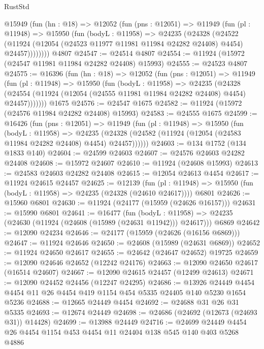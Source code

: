 \begin{lexlean}{RustStd}
\begin{coremodule}
    @15949
      (fun (hn : @18) =>
      @12052
        (fun (pns : @12051) =>
        @11949
          (fun (pl : @11948) =>
          @15950
            (fun (bodyL : @11958) =>
            @24235
              (@24328
                (@24522
                  (@11924 (@12054 (@24523 @11977 @11981 @11984 @24282 @24408) @4454) @24457))))))))
    @4807
@24547 := @24514 @4807
@24554 := @11924 (@15972 (@24547 @11981 @11984 @24282 @24408) @15993)
@24555 := @24523 @4807
@24575 := @16396
    (fun (hn : @18) =>
    @12052
      (fun (pns : @12051) =>
      @11949
        (fun (pl : @11948) =>
        @15950
          (fun (bodyL : @11958) =>
          @24235
            (@24328
              (@24554 (@11924 (@12054 (@24555 @11981 @11984 @24282 @24408) @4454) @24457)))))))
    @1675
@24576 := @24547 @1675
@24582 := @11924 (@15972 (@24576 @11984 @24282 @24408) @15993)
@24583 := @24555 @1675
@24599 := @16426
    (fun (pns : @12051) =>
    @11949
      (fun (pl : @11948) =>
      @15950
        (fun (bodyL : @11958) =>
        @24235 (@24328 (@24582 (@11924 (@12054 (@24583 @11984 @24282 @24408) @4454) @24457))))))
@24603 := @134 @1752 (@134 @1833 @140)
@24604 := @24599 @24603
@24607 := @24576 @24603 @24282 @24408
@24608 := @15972 @24607
@24610 := @11924 (@24608 @15993)
@24613 := @24583 @24603 @24282 @24408
@24615 := @12054 @24613 @4454
@24617 := @11924 @24615 @24457
@24625 := @12139
    (fun (pl : @11948) => @15950 (fun (bodyL : @11958) => @24235 (@24328 (@24610 @24617))))
    @6801
@24626 := @15960 @6801
@24630 := @11924 (@24177 (@15959 (@24626 @16157)))
@24631 := @15990 @6801
@24641 := @16477
    (fun (bodyL : @11958) => @24235 (@24630 (@11924 (@24608 (@15989 (@24631 @11942))) @24617)))
    @6869
@24642 := @12090 @24234
@24646 := @24177 (@15959 (@24626 (@16156 @6869)))
@24647 := @11924 @24646
@24650 := @24608 (@15989 (@24631 @6869))
@24652 := @11924 @24650 @24617
@24655 := @24642 (@24647 @24652) @19725
@24659 := @12090 @24646 @24652 (@12242 @24176)
@24663 := @12090 @24650 @24617 (@16514 @24607)
@24667 := @12090 @24615 @24457 (@12499 @24613)
@24671 := @12090 @24452 @24456 (@12247 @24295)
@24686 := @13926
    @24449
    @4454
    @4454
    @11
    @26
    @4454
    @419
    @1154
    @454
    @5335
    @24405
    @140
    @5230
    @1654
    @5236
@24688 := @12665 @24449 @4454
@24692 := @24688 @31 @26 @31 @5335
@24693 := @12674 @24449
@24698 := @24686 (@24692 (@12673 (@24693 @31)) @14428)
@24699 := @13988 @24449
@24716 := @24699
    @24449
    @4454
    @26
    @4454
    @1154
    @453
    @4454
    @11
    @24404
    @138
    @545
    @140
    @403
    @5268
    @4886

\end{coremodule}
\end{lexlean}
